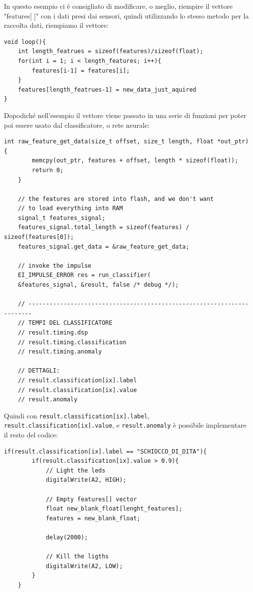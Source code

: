 \newpage{}

In questo esempio ci è consigliato di modificare, o meglio, riempire il vettore "features[ ]" con i dati presi dai sensori, quindi utilizzando lo stesso metodo per la raccolta dati, riempiamo il vettore:
\begin{lstlisting}[language=Arduino]
void loop(){
    int length_featrues = sizeof(features)/sizeof(float);
    for(int i = 1; i < length_features; i++){
        features[i-1] = features[i];
    }
    features[length_featrues-1] = new_data_just_aquired
}
\end{lstlisting}
Dopodiché nell'esempio il vettore viene passato in una serie di funzioni per poter poi essere usato dal classificatore, o rete neurale:
\begin{lstlisting}[language=Arduino]
    int raw_feature_get_data(size_t offset, size_t length, float *out_ptr) {
        memcpy(out_ptr, features + offset, length * sizeof(float));
        return 0;
    }

    // the features are stored into flash, and we don't want 
    // to load everything into RAM
    signal_t features_signal;
    features_signal.total_length = sizeof(features) / sizeof(features[0]);
    features_signal.get_data = &raw_feature_get_data;

    // invoke the impulse
    EI_IMPULSE_ERROR res = run_classifier(
    &features_signal, &result, false /* debug */);
    
    // -----------------------------------------------------------------------
    // TEMPI DEL CLASSIFICATORE
    // result.timing.dsp
    // result.timing.classification
    // result.timing.anomaly
    
    // DETTAGLI:
    // result.classification[ix].label
    // result.classification[ix].value
    // result.anomaly
\end{lstlisting}

Quindi con \lstinline{result.classification[ix].label}, \lstinline{result.classification[ix].value}, e \lstinline{result.anomaly} è possibile implementare il resto del codice:

\begin{lstlisting}[language=Arduino]
    if(result.classification[ix].label == "SCHIOCCO_DI_DITA"){
        if(result.classification[ix].value > 0.9){
            // Light the leds
            digitalWrite(A2, HIGH);
            
            // Empty features[] vector
            float new_blank_float[lenght_features];
            features = new_blank_float;
            
            delay(2000);
            
            // Kill the ligths
            digitalWrite(A2, LOW);
        }
    }
\end{lstlisting}

